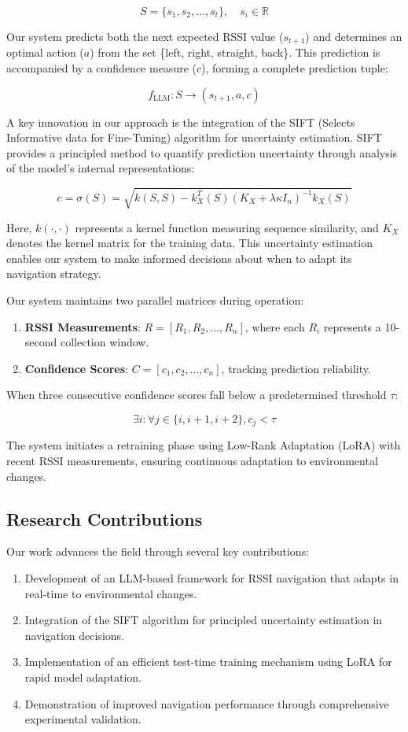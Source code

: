 \documentclass[12pt]{article}
\begin{document}
\[
S = \{s_1, s_2, \ldots, s_t\}, \quad s_i \in \mathbb{R}
\]

Our system predicts both the next expected RSSI value ($s_{t+1}$) and determines an optimal action ($a$) from the set \{left, right, straight, back\}. This prediction is accompanied by a confidence measure ($c$), forming a complete prediction tuple:

\[
f_{\text{LLM}}: S \rightarrow (s_{t+1}, a, c)
\]

A key innovation in our approach is the integration of the SIFT (Selects Informative data for Fine-Tuning) algorithm for uncertainty estimation. SIFT provides a principled method to quantify prediction uncertainty through analysis of the model's internal representations:

\[
c = \sigma(S) = \sqrt{k(S,S) - k_X^T(S)(K_X + \lambda\kappa I_n)^{-1}k_X(S)}
\]

Here, $k(\cdot,\cdot)$ represents a kernel function measuring sequence similarity, and $K_X$ denotes the kernel matrix for the training data. This uncertainty estimation enables our system to make informed decisions about when to adapt its navigation strategy.

Our system maintains two parallel matrices during operation:
\begin{enumerate}
    \item \textbf{RSSI Measurements}: $R = [R_1, R_2, \ldots, R_n]$, where each $R_i$ represents a 10-second collection window.
    \item \textbf{Confidence Scores}: $C = [c_1, c_2, \ldots, c_n]$, tracking prediction reliability.
\end{enumerate}

When three consecutive confidence scores fall below a predetermined threshold $\tau$:

\[
\exists i : \forall j \in \{i, i+1, i+2\}, c_j < \tau
\]

The system initiates a retraining phase using Low-Rank Adaptation (LoRA) with recent RSSI measurements, ensuring continuous adaptation to environmental changes.

\subsection*{Research Contributions}

Our work advances the field through several key contributions:
\begin{enumerate}
    \item Development of an LLM-based framework for RSSI navigation that adapts in real-time to environmental changes.
    \item Integration of the SIFT algorithm for principled uncertainty estimation in navigation decisions.
    \item Implementation of an efficient test-time training mechanism using LoRA for rapid model adaptation.
    \item Demonstration of improved navigation performance through comprehensive experimental validation.
\end{enumerate}
\end{document}
